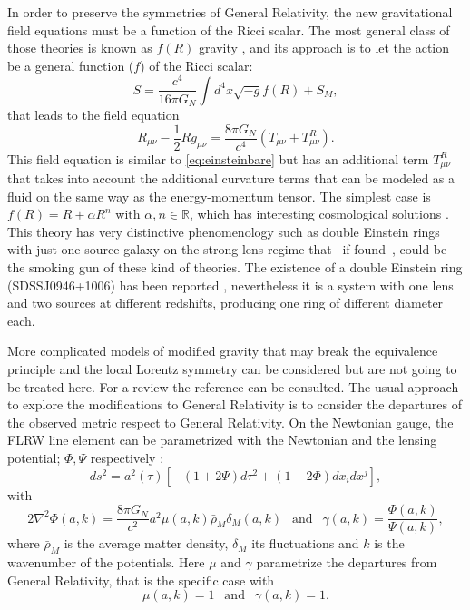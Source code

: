 In order to preserve the symmetries of General Relativity, the new gravitational field equations must be a function of the Ricci scalar. The most general class of those theories is known as $f(R)$ gravity \cite{2010LRR....13....3D,2010RvMP...82..451S}, and its approach is to let the action be a general function ($f$) of the Ricci scalar:
\begin{equation}
S = \frac{c^4}{16\pi G_N}\int d^4x\sqrt{-g}f(R)+S_M,
\end{equation}
that leads to the field equation
\begin{equation}
R_{\mu\nu}-\frac{1}{2}Rg_{\mu\nu}=\frac{8\pi G_N}{c^4}( T_{\mu\nu}+T_{\mu\nu}^R).
\end{equation}
This field equation is similar to \autoref{eq:einsteinbare} but has an additional term $T_{\mu\nu}^R$ that takes into account the additional curvature terms that can be modeled as a fluid on the same way as the energy-momentum tensor. The simplest case is $f(R) =R+\alpha R^n$ with $\alpha,n\in\mathbb{R}$, which has interesting cosmological solutions \cite{PhysRevD.85.083511}. This theory has very distinctive phenomenology such as double Einstein rings with just one source galaxy on the strong lens regime \cite{2011PhRvD..83b4030N} that --if found--, could be the smoking gun of these kind of theories. The existence of a double Einstein ring (SDSSJ0946+1006) has been reported \cite{2008ApJ...677.1046G}, nevertheless it is a system with one lens and two sources at different redshifts, producing one ring of different diameter each.
\newline

More complicated models of modified gravity that may break the equivalence principle and the local Lorentz symmetry can be considered but are not going to be treated here. For a review the reference \cite{2015CQGra..32x3001B} can be consulted. The usual approach to explore the modifications to General Relativity \cite{2015PhRvD..91h3504L} is to consider the departures of the observed metric respect to General Relativity. On the Newtonian gauge, the FLRW line element can be parametrized with the Newtonian and the lensing potential; $\Phi,\Psi$ respectively \cite{2015PhRvD..91h3504L}:
\begin{equation}
ds^2 = a^2(\tau)[-(1+2\Psi)d\tau^2+(1-2\Phi)dx_idx^j],
\end{equation}
with
\begin{equation}
2\nabla^2\Phi(a,k) = \frac{8\pi G_N}{c^2}a^2\mu(a,k)\bar \rho_M\delta_M(a,k)\ \ \mbox{ and }\ \ \gamma(a,k)=\frac{\Phi(a,k)}{\Psi(a,k)},
\end{equation}
where $\bar \rho_M$ is the average matter density, $\delta_M$ its fluctuations and $k$ is the wavenumber of the potentials. Here $\mu$ and $\gamma$ parametrize the departures from General Relativity, that is the specific case with
\begin{equation}
\mu(a,k) = 1\ \ \mbox{ and }\ \ \gamma(a,k) = 1.
\end{equation}

